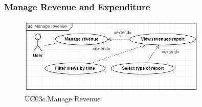 \documentclass[../thesis.tex]{subfiles}
\begin{document}
\subsubsection{Manage Revenue and Expenditure}
\begin{figure}[H]
    \centering
    \includegraphics[width=0.8\textwidth]{images/UCD_ManageRevenue.png}
    \caption{UC03c.Manage Revenue}
    \label{fig:UCD-manage-revenue}
\end{figure}
\end{document}
